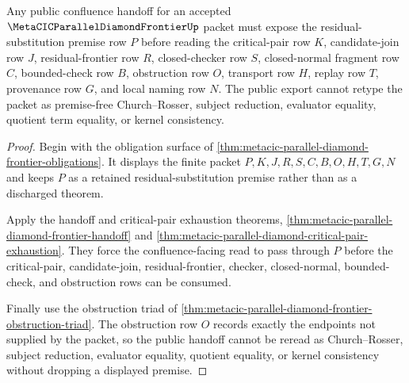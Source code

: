 \begin{theorem}
\label{thm:metacic-parallel-diamond-frontier-residual-premise-public-export}
Any public confluence handoff for an accepted $\MetaCICParallelDiamondFrontierUp$ packet must expose the residual-substitution premise row $P$ before reading the critical-pair row $K$, candidate-join row $J$, residual-frontier row $R$, closed-checker row $S$, closed-normal fragment row $C$, bounded-check row $B$, obstruction row $O$, transport row $H$, replay row $T$, provenance row $G$, and local naming row $N$. The public export cannot retype the packet as premise-free Church--Rosser, subject reduction, evaluator equality, quotient term equality, or kernel consistency.
\end{theorem}
\begin{proof}
Begin with the obligation surface of \autoref{thm:metacic-parallel-diamond-frontier-obligations}. It displays the finite packet $P,K,J,R,S,C,B,O,H,T,G,N$ and keeps $P$ as a retained residual-substitution premise rather than as a discharged theorem.

Apply the handoff and critical-pair exhaustion theorems, \autoref{thm:metacic-parallel-diamond-frontier-handoff} and \autoref{thm:metacic-parallel-diamond-critical-pair-exhaustion}. They force the confluence-facing read to pass through $P$ before the critical-pair, candidate-join, residual-frontier, checker, closed-normal, bounded-check, and obstruction rows can be consumed.

Finally use the obstruction triad of \autoref{thm:metacic-parallel-diamond-frontier-obstruction-triad}. The obstruction row $O$ records exactly the endpoints not supplied by the packet, so the public handoff cannot be reread as Church--Rosser, subject reduction, evaluator equality, quotient equality, or kernel consistency without dropping a displayed premise.
\end{proof}
